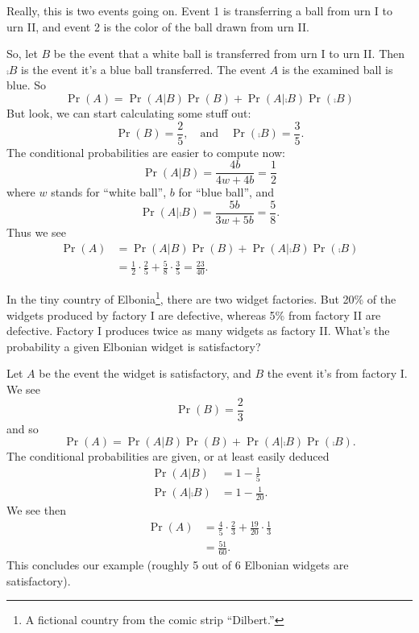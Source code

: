  Really, this is two events going on. Event 1 is
transferring a ball from urn I to urn II, and event 2 is the color of
the ball drawn from urn II. 

So, let $B$ be the event that a white ball is transferred from urn I to
urn II. Then $\comp{B}$ is the event it's a blue ball transferred. The
event $A$ is the examined ball is blue. So
\begin{equation}
\Pr(A)=\Pr(A|B)\Pr(B)+\Pr(A|\comp{B})\Pr(\comp{B})
\end{equation}
But look, we can start calculating some stuff out:
\begin{equation}
\Pr(B) = \frac{2}{5},\quad\mbox{and}\quad\Pr(\comp{B})=\frac{3}{5}.
\end{equation}
The conditional probabilities are easier to compute now:
\begin{equation}
\Pr(A|B)=\frac{4b}{4w+4b}=\frac{1}{2}
\end{equation}
where $w$ stands for ``white ball'', $b$ for ``blue ball'', and
\begin{equation}
\Pr(A|\comp{B})=\frac{5b}{3w+5b}=\frac{5}{8}.
\end{equation}
Thus we see
\begin{subequations}
\begin{align}
\Pr(A)&=\Pr(A|B)\Pr(B)+\Pr(A|\comp{B})\Pr(\comp{B})\\
&=\frac{1}{2}\cdot\frac{2}{5}+\frac{5}{8}\cdot\frac{3}{5}=\frac{23}{40}.
\end{align}
\end{subequations}

In the tiny country of Elbonia\footnote{A fictional country from the
comic strip ``Dilbert.''}, there are two widget factories. But 20\%
of the widgets produced by factory I are defective, whereas 5\% from
factory II are defective. Factory I produces twice as many widgets as
factory II. What's the probability a given Elbonian widget is
satisfactory?

Let $A$ be the event the widget is satisfactory, and $B$
the event it's from factory I. We see
\begin{equation}
\Pr(B)=\frac{2}{3}
\end{equation}
and so
\begin{equation}
\Pr(A)=\Pr(A|B)\Pr(B)+\Pr(A|\comp{B})\Pr(\comp{B}).
\end{equation}
The conditional probabilities are given, or at least easily deduced
\begin{subequations}
\begin{align}
\Pr(A|B)&=1-\frac{1}{5}\\
\Pr(A|\comp{B})&=1-\frac{1}{20}.
\end{align}
\end{subequations}
We see then
\begin{equation}
\begin{split}
\Pr(A)&=\frac{4}{5}\cdot\frac{2}{3}+\frac{19}{20}\cdot\frac{1}{3}\\
&=\frac{51}{60}.
\end{split}
\end{equation}
This concludes our example (roughly 5 out of 6 Elbonian widgets are
satisfactory). 
